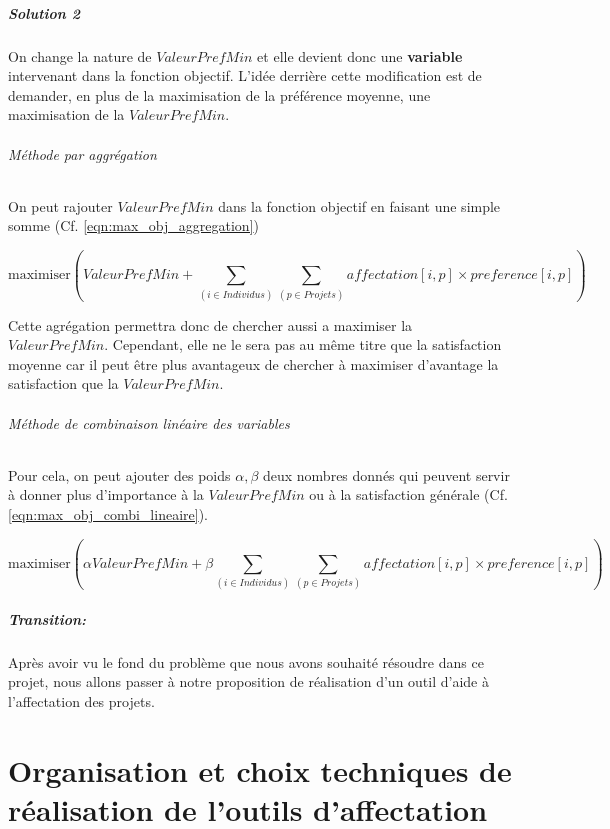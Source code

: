 \documentclass[final,poster]{polytech/polytech}
\begin{document}
\paragraph{Solution 2}
On change la nature de $ValeurPrefMin$ et elle devient donc une \textbf{variable} intervenant dans la fonction objectif.
L'idée derrière cette modification est de demander, en plus de la maximisation de la préférence moyenne, une maximisation de la $ValeurPrefMin$.

\subparagraph{Méthode par aggrégation}
On peut rajouter $ValeurPrefMin$ dans la fonction objectif en faisant une simple somme (Cf. \eqref{eqn:max_obj_aggregation})

\begin{equation}
\label{eqn:max_obj_aggregation}
\text{maximiser} \left( ValeurPrefMin + \sum_{(i \in Individus)} \sum_{(p\in Projets)} affectation[i,p]\times preference[i,p] \right)
\end{equation}

Cette agrégation permettra donc de chercher aussi a maximiser la $ValeurPrefMin$. Cependant, elle ne le sera pas au même titre que la satisfaction moyenne car il peut être plus avantageux de chercher à maximiser d'avantage la satisfaction que la $ValeurPrefMin$.

\subparagraph{Méthode de combinaison linéaire des variables}
Pour cela, on peut ajouter des poids $\alpha, \beta$ deux nombres donnés qui peuvent servir à donner plus d'importance à la $ValeurPrefMin$ ou à la satisfaction générale (Cf. \eqref{eqn:max_obj_combi_lineaire}).

\begin{equation}
\label{eqn:max_obj_combi_lineaire}
\text{maximiser} \left( \alpha ValeurPrefMin + \beta \sum_{(i \in Individus)} \sum_{(p\in Projets)} affectation[i,p]\times preference[i,p] \right)
\end{equation}


\paragraph{Transition:}
Après avoir vu le fond du problème que nous avons souhaité résoudre dans ce projet, nous allons passer à notre proposition de réalisation d'un outil d'aide à l'affectation des projets.


\chapter{Organisation et choix techniques de réalisation de l'outils d'affectation}
\end{document}
